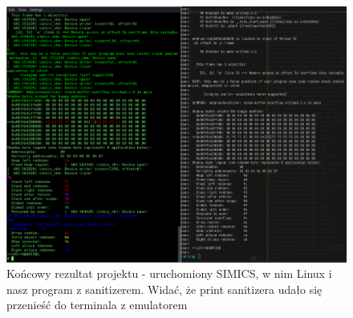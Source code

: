 \documentclass[../main.tex]{subfiles}
\begin{document}
\begin{figure}
	\centering
	\includegraphics[width=0.7\linewidth]{images/end}
	\caption{Końcowy rezultat projektu - uruchomiony SIMICS, w nim Linux i nasz program z sanitizerem. Widać, że print sanitizera udało się przenieść do terminala z emulatorem}
	\label{fig:end}
\end{figure}
\end{document}

